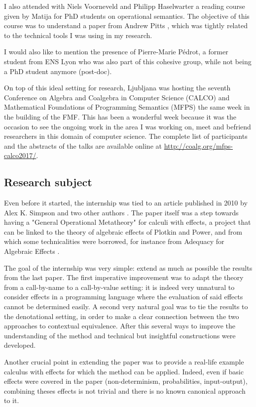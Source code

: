 I also attended with Niels Voorneveld and Philipp Haselwarter 
a reading course given by Matija for PhD students on operational semantics. The 
objective of this course was to understand a paper from Andrew Pitts 
\cite{Pitts2000}, which was tightly related to the technical tools I was 
using in my research. 

I would also like to mention the presence of 
Pierre-Marie Pédrot, a former student from ENS Lyon 
who was also part of this cohesive group, while 
not being a PhD student anymore (post-doc).

On top of this ideal setting for research, 
Ljubljana was hosting the seventh Conference on Algebra and
Coalgebra in Computer Science (CALCO) and 
Mathematical Foundations of Programming Semantics (MFPS)
the same week in the building of the FMF. This has 
been a wonderful week because it was the occasion 
to see the ongoing work in the area I was working on,
meet and befriend researchers in this domain 
of computer science. The complete list of participants 
and the abstracts of the talks are
available online at \url{http://coalg.org/mfps-calco2017/}.

\subsection{Research subject}

Even before it started, the internship 
was tied to an article published in 2010 
by Alex K. Simpson and two other authors \cite{gom}.
The paper itself was a step towards having a 
"General Operational Metatheory" for calculi 
with effects, a project that can be linked 
to the theory of algebraic effects of Plotkin 
and Power, and from which some technicalities 
were borrowed, for instance from 
Adequacy for Algebraic Effects \cite{plotkin2001adequacy}.

The goal of the internship was very simple: extend 
as much as possible the results from the last paper. 
The first imperative improvement was to adapt the theory 
from a call-by-name to a call-by-value setting:
it is indeed very unnatural to consider effects in 
a programming language where the evaluation of said 
effects cannot be determined easily. A second very 
natural goal was to tie the results to the denotational 
setting, in order to make a clear connection between 
the two approaches to contextual equivalence.
After this several ways to improve 
the understanding of the method and technical but insightful 
constructions were developed. 

Another crucial point in extending the paper was to provide 
a real-life example calculus with effects for which 
the method can be applied. Indeed, even if basic effects
were covered in the paper (non-determinism, probabilities,
input-output), combining theses effects is not trivial
and there is no known canonical approach to it.





